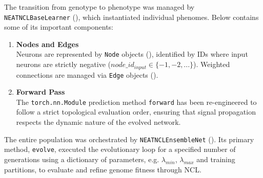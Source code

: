 The transition from genotype to phenotype was managed by \texttt{NEATNCLBaseLearner} (), which instantiated individual phenomes. Below contains some of its important components: 
\begin{enumerate}
    \item \textbf{Nodes and Edges} \\
    Neurons are represented by \texttt{Node} objects (), identified by IDs where input neurons are strictly negative ($node\_id_{input} \in \{-1, -2, ...\}$). Weighted connections are managed via \texttt{Edge} objects (). 

    \item \textbf{Forward Pass} \\
    The \texttt{torch.nn.Module} prediction method \texttt{forward} has been re-engineered to follow a strict topological evaluation order, ensuring that signal propagation respects the dynamic nature of the evolved network. 
\end{enumerate}

The entire population was orchestrated by \texttt{NEATNCLEnsembleNet} (). Its primary method, \texttt{evolve}, executed the evolutionary loop for a specified number of generations using a dictionary of parameters, e.g. $\lambda_{min}$, $\lambda_{max}$ and training partitions, to evaluate and refine genome fitness through NCL. 



